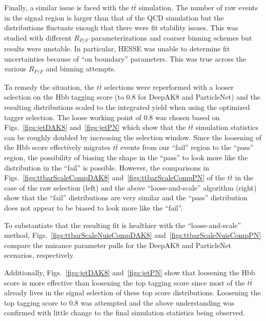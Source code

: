 \documentclass[10pt,oneside]{article}
\begin{document}
Finally, a similar issue is faced with the $t\bar{t}$ simulation. The number of raw events in the signal region
is larger than that of the QCD simulation but the distributions fluctuate enough that there were fit stability issues.
This was studied with different $R_{P/F}$ parameterizations and coarser binning schemes but results were unstable.
In particular, HESSE was unable to determine fit uncertainties because of ``on boundary'' parameters. This was true
across the various $R_{P/F}$ and binning attempts.

To remedy the situation, the $t\bar{t}$ selections were reperformed with a looser selection on the Hbb tagging score
(to 0.8 for DeepAK8 and ParticleNet) and the resulting distributions scaled to the integrated yield when using the optimized
tagger selection. The loose working point of 0.8 was chosen based on 
Figs.~\ref{figs:jetDAK8} and~\ref{figs:jetPN} which show that the $t\bar{t}$ simulation statistics can be roughly doubled
by increasing the selection window. Since the loosening of the Hbb score effectively migrates $t\bar{t}$ events from
our ``fail'' region to the ``pass'' region, the possibility of biasing the shape in the ``pass'' to look more like the
distribution in the ``fail'' is possible. However, the comparisons in Figs.~\ref{figs:ttbarScaleCompDAK8} and~\ref{figs:ttbarScaleCompPN}
of the $t\bar{t}$ in the case of the raw selection (left) and the above ``loose-and-scale'' algorithm (right) show that the ``fail''
distributions are very similar and the ``pass'' distribution does not appear to be biased to look more like the ``fail''.

To substantiate that the resulting fit is healthier with the ``loose-and-scale'' method, Figs.~\ref{figs:ttbarScaleNuisCompDAK8}
and~\ref{figs:ttbarScaleNuisCompPN} compare the nuisance parameter pulls for the DeepAK8 and ParticleNet scenarios, respectively.

Additionally, Figs.~\ref{figs:jetDAK8} and~\ref{figs:jetPN} show that loosening the Hbb score is more
effective than loosening the top tagging score since most of the $t\bar{t}$ already lives in the signal selection of
these top score distributions. Loosening the top tagging score to 0.8 was attempted and the above understanding was confirmed
with little change to the final simulation statistics being observed.
\end{document}
